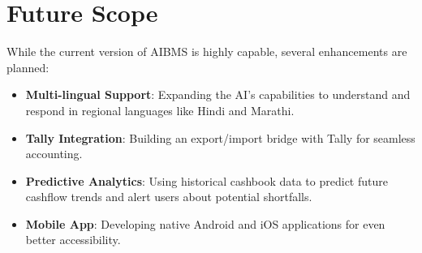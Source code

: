 \documentclass[12pt,a4paper]{report}
\begin{document}
\section{Future Scope}
While the current version of AIBMS is highly capable, several enhancements are planned:
\begin{itemize}
    \item \textbf{Multi-lingual Support}: Expanding the AI's capabilities to understand and respond in regional languages like Hindi and Marathi.
    \item \textbf{Tally Integration}: Building an export/import bridge with Tally for seamless accounting.
    \item \textbf{Predictive Analytics}: Using historical cashbook data to predict future cashflow trends and alert users about potential shortfalls.
    \item \textbf{Mobile App}: Developing native Android and iOS applications for even better accessibility.
\end{itemize}
\end{document}
